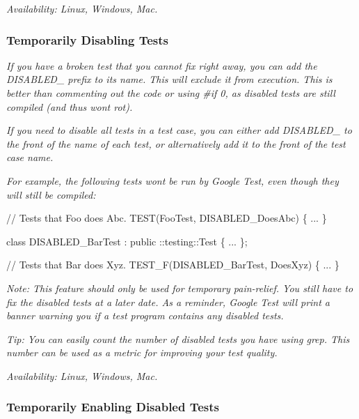 {\itshape {\itshape Availability\+:} Linux, Windows, Mac.}

{\itshape \subsubsection*{Temporarily Disabling Tests}}

{\itshape }

{\itshape If you have a broken test that you cannot fix right away, you can add the {\ttfamily D\+I\+S\+A\+B\+L\+E\+D\+\_\+} prefix to its name. This will exclude it from execution. This is better than commenting out the code or using {\ttfamily \#if 0}, as disabled tests are still compiled (and thus won\textquotesingle{}t rot).}

{\itshape If you need to disable all tests in a test case, you can either add {\ttfamily D\+I\+S\+A\+B\+L\+E\+D\+\_\+} to the front of the name of each test, or alternatively add it to the front of the test case name.}

{\itshape For example, the following tests won\textquotesingle{}t be run by Google Test, even though they will still be compiled\+:}

{\itshape 
\begin{DoxyCode}
// Tests that Foo does Abc.
TEST(FooTest, DISABLED\_DoesAbc) \{ ... \}

class DISABLED\_BarTest : public ::testing::Test \{ ... \};

// Tests that Bar does Xyz.
TEST\_F(DISABLED\_BarTest, DoesXyz) \{ ... \}
\end{DoxyCode}
}

{\itshape {\itshape Note\+:} This feature should only be used for temporary pain-\/relief. You still have to fix the disabled tests at a later date. As a reminder, Google Test will print a banner warning you if a test program contains any disabled tests.}

{\itshape {\itshape Tip\+:} You can easily count the number of disabled tests you have using {\ttfamily grep}. This number can be used as a metric for improving your test quality.}

{\itshape {\itshape Availability\+:} Linux, Windows, Mac.}

{\itshape \subsubsection*{Temporarily Enabling Disabled Tests}}

{\itshape }

